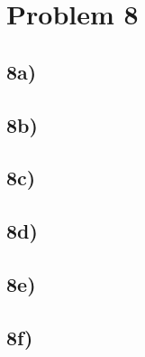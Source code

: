 \section*{Problem 8}
\subsection*{8a)}
\subsection*{8b)}
\subsection*{8c)}
\subsection*{8d)}
\subsection*{8e)}
\subsection*{8f)}

